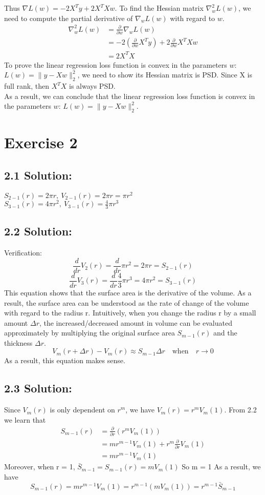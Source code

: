 \documentclass{article}
\begin{document}
Thus $\nabla L(w) = - 2 X^T y + 2 X^T X w$. To find the Hessian matrix $\nabla_w^2 L(w)$, we need to compute the partial derivative of $\nabla_w L(w)$ with regard to $w$.
\begin{align*}
    \nabla_w^2 L(w) &= \frac{\partial}{\partial w} \nabla_w L(w) \\
                    &= -2 (\frac{\partial}{\partial w} X^T y) + 2 \frac{\partial}{\partial w} X^T X w\\
                    &= 2 X^T X
\end{align*}
To prove the linear regression loss function is convex in the parameters $w$: $L(w) = \lVert y - X w\rVert^2_2 $, we need to show its Hessian matrix is PSD.
Since X is full rank, then $X^T X$ is always PSD. \\ 
As a result, we can conclude that the linear regression loss function is convex in the parameters $w$: $L(w) = \lVert y - X w\rVert^2_2 $.

\section*{Exercise 2}
\subsection*{2.1 Solution:}
$S_{2-1}(r) = 2 \pi r, \ V_{2-1}(r) = 2 \pi r = \pi r^2$ \\
$S_{3-1}(r) = 4 \pi r^2, \ V_{3-1}(r) = \frac{4}{3} \pi r^3$

\subsection*{2.2 Solution:}
Verification: 
\[\frac{d}{dr}V_2(r)=\frac{d}{dr}\pi r^2=2\pi r=S_{2-1}(r)\]
\[\frac{d}{dr}V_3(r)=\frac{d}{dr}\frac{4}{3}\pi r^3=4\pi r^2=S_{3-1}(r)\]
This equation shows that the surface area is the derivative of the volume.
As a result, the surface area can be understood as the rate of change of the volume with regard to the radius r. Intuitively, when you
change the radius r by a small amount $\Delta r$, the increased/decreased amount in volume can be evaluated approximately by multiplying the original surface area $S_{m-1} (r)$ and the thickness $\Delta r$.
\[V_m (r + \Delta r) - V_m(r) \approx S_{m-1} \Delta r  \quad \text{when} \quad r \to 0\]  
As a result, this equation makes sense.

\subsection*{2.3 Solution:}
Since $V_m(r)$ is only dependent on $r^m$, we have $V_m(r) = r^m V_m(1)$. From 2.2 we learn that
\begin{align*}
    S_{m-1}(r) &= \frac{\partial}{\partial r}(r^m V_m(1)) \\
               &= m r^{m-1} V_m(1) + r^m \frac{\partial}{\partial r} V_m(1) \\
               &= m r^{m-1} V_m(1)
\end{align*}
Moreover, when r = 1, $\bar{S}_{m-1} = S_{m-1}(r) = m V_m(1)$ So m = 1 As a result, we have 
\[S_{m-1}(r) = m r^{m-1} V_m(1) = r^{m-1} (m V_m(1)) = r^{m-1} \bar{S}_{m-1}\]
\end{document}
